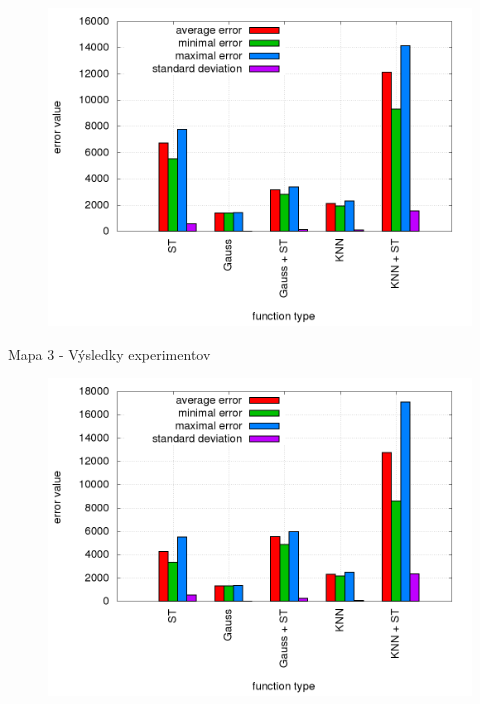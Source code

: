 \begin{figure}[!htb]
\centering
\includegraphics[scale=.4]{../../results_q_learning/map_2/trials_average_results.png}
\end{figure}


Mapa 3 - Výsledky experimentov

\begin{figure}[!htb]
\centering
\includegraphics[scale=.4]{../../results_q_learning/map_3/trials_average_results.png}
\end{figure}
